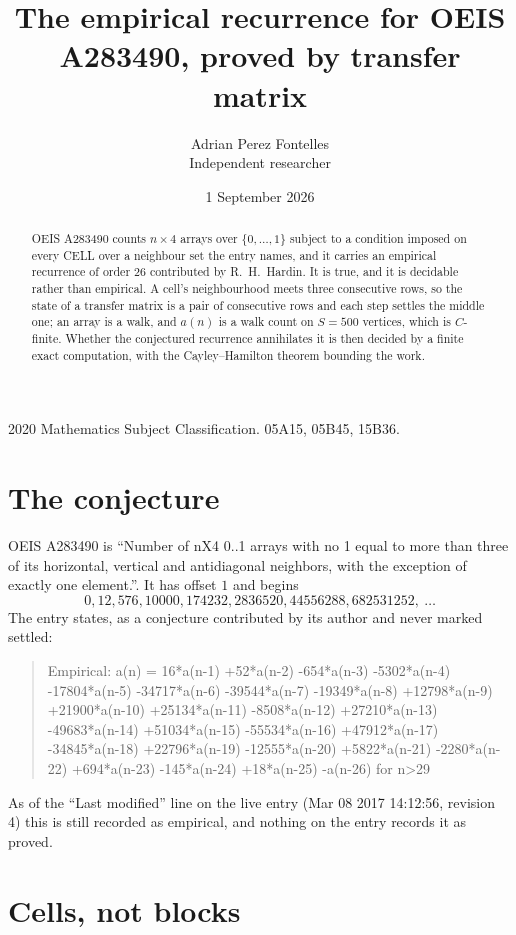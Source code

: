 \documentclass[11pt,a4paper]{article}
\title{The empirical recurrence for OEIS A283490, proved by transfer matrix}
\author{Adrian Perez Fontelles\\ \small Independent researcher}
\date{1 September 2026}
\theoremstyle{plain}
\theoremstyle{definition}
\begin{document}
\maketitle

\begin{abstract}
OEIS A283490 counts $n\times4$ arrays over $\{0,\dots,1\}$ subject to a condition imposed on
every CELL over a neighbour set the entry names, and it carries an empirical recurrence of
order $26$ contributed by R.~H.~Hardin. It is true, and it is decidable rather than
empirical. A cell's neighbourhood meets three consecutive rows, so the state of a transfer
matrix is a pair of consecutive rows and each step settles the middle one; an array is a
walk, and $a(n)$ is a walk count on $S=500$ vertices, which is $C$-finite. Whether the
conjectured recurrence annihilates it is then decided by a finite exact computation, with the
Cayley--Hamilton theorem bounding the work.
\end{abstract}

\noindent\small 2020 Mathematics Subject Classification. 05A15, 05B45, 15B36.\normalsize

\section{The conjecture}

OEIS A283490 is ``Number of nX4 0..1 arrays with no 1 equal to more than three of its horizontal, vertical and antidiagonal neighbors, with the exception of exactly one element.''. It has offset $1$ and begins
\[
0, 12, 576, 10000, 174232, 2836520, 44556288, 682531252,\ \dots
\]
The entry states, as a conjecture contributed by its author and never marked settled:
\begin{quote}
Empirical: a(n) = 16*a(n-1) +52*a(n-2) -654*a(n-3) -5302*a(n-4) -17804*a(n-5) -34717*a(n-6) -39544*a(n-7) -19349*a(n-8) +12798*a(n-9) +21900*a(n-10) +25134*a(n-11) -8508*a(n-12) +27210*a(n-13) -49683*a(n-14) +51034*a(n-15) -55534*a(n-16) +47912*a(n-17) -34845*a(n-18) +22796*a(n-19) -12555*a(n-20) +5822*a(n-21) -2280*a(n-22) +694*a(n-23) -145*a(n-24) +18*a(n-25) -a(n-26) for n>29
\end{quote}
As of the ``Last modified'' line on the live entry (Mar 08 2017 14:12:56, revision 4) this is still
recorded as empirical, and nothing on the entry records it as proved.

\section{Cells, not blocks}
\end{document}
